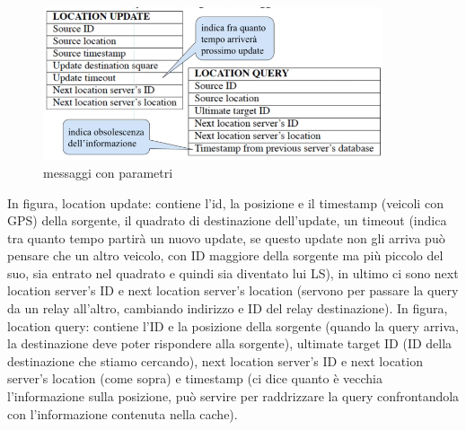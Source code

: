 \documentclass[12pt,italian]{report}
\begin{document}
\begin{figure}[h]
\centering
\includegraphics[width=100mm]{img/strdagls.PNG}
\caption{messaggi con parametri}
\label{fig:pseudofefre}
\end{figure}
\noindent In figura, location update: contiene l'id, la posizione e il timestamp (veicoli con GPS) della sorgente, il quadrato di destinazione dell'update, un timeout (indica tra quanto tempo partirà un nuovo update, se questo update non gli arriva può pensare che un altro veicolo, con ID maggiore della sorgente ma più piccolo del suo, sia entrato nel quadrato e quindi sia diventato lui LS), in ultimo ci sono next location server's ID e next location server's location (servono per passare la query da un relay all'altro, cambiando indirizzo e ID del relay destinazione). 
\bigbreak
\noindent In figura, location query: contiene l'ID e la posizione della sorgente (quando la query arriva, la destinazione deve poter rispondere alla sorgente), ultimate target ID (ID della destinazione che stiamo cercando), next location server's ID e next location server's location (come sopra) e timestamp (ci dice quanto è vecchia l'informazione sulla posizione, può servire per raddrizzare la query confrontandola con l'informazione contenuta nella cache). 
\end{document}

